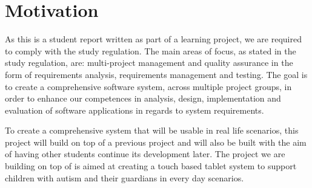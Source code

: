 \section{Motivation}
As this is a student report written as part of a learning project, we are required to comply with the study regulation.
The main areas of focus, as stated in the study regulation, are: multi-project management and quality assurance in the form of requirements analysis, requirements management and testing.
The goal is to create a comprehensive software system, across multiple project groups, in order to enhance our competences in analysis, design, implementation and evaluation of software applications in regards to system requirements. \cite{studyreg}

To create a comprehensive system that will be usable in real life scenarios, this project will build on top of a previous project and will also be built with the aim of having other students continue its development later.
The project we are building on top of is aimed at creating a touch based tablet system to support children with autism and their guardians in every day scenarios.
